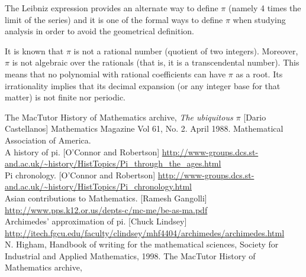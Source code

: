 \documentclass[12pt]{article}
\newcommand{\<}{\langle}
\renewcommand{\>}{\rangle}
\begin{document}
The Leibniz expression provides an alternate way to define $\pi$ (namely 4 times the limit of the series) and it is one of the formal ways to define $\pi$ when studying analysis in order to avoid the geometrical definition.

It is known that $\pi$ is not a rational number (quotient of two integers). Moreover, $\pi$ is not algebraic over the rationals (that is, it is a transcendental number). This means that no polynomial with rational coefficients can have $\pi$ as a root.  Its irrationality implies that its decimal expansion (or any integer base for that matter) is not finite nor periodic.

\begin{thebibliography}{99}
 The MacTutor History of Mathematics archive, 
\emph{The ubiquitous $\pi$} [Dario Castellanos] Mathematics Magazine Vol 61, No. 2. April 1988. Mathematical Association of America.\\
 A history of pi. [O'Connor and Robertson]
\url{http://www-groups.dcs.st-and.ac.uk/~history/HistTopics/Pi_through_the_ages.html}\\
 Pi chronology. [O'Connor and Robertson]
\url{http://www-groups.dcs.st-and.ac.uk/~history/HistTopics/Pi_chronology.html}\\
 Asian contributions to Mathematics. [Ramesh Gangolli]
\url{http://www.pps.k12.or.us/depts-c/mc-me/be-as-ma.pdf}\\
 Archimedes' approximation of pi. [Chuck Lindsey]
\url{http://itech.fgcu.edu/faculty/clindsey/mhf4404/archimedes/archimedes.html}\\
 N. Higham, Handbook of writing for the mathematical sciences, Society for Industrial and Applied Mathematics, 1998.
The MacTutor History of Mathematics archive,
\end{thebibliography}
\end{document}
